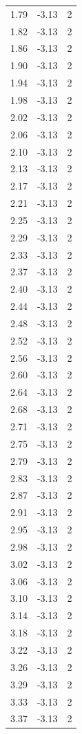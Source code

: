 \begin{longtable}{lrr}
  1.79 & -3.13 & 2 \\
  1.82 & -3.13 & 2 \\
  1.86 & -3.13 & 2 \\
  1.90 & -3.13 & 2 \\
  1.94 & -3.13 & 2 \\
  1.98 & -3.13 & 2 \\
  2.02 & -3.13 & 2 \\
  2.06 & -3.13 & 2 \\
  2.10 & -3.13 & 2 \\
  2.13 & -3.13 & 2 \\
  2.17 & -3.13 & 2 \\
  2.21 & -3.13 & 2 \\
  2.25 & -3.13 & 2 \\
  2.29 & -3.13 & 2 \\
  2.33 & -3.13 & 2 \\
  2.37 & -3.13 & 2 \\
  2.40 & -3.13 & 2 \\
  2.44 & -3.13 & 2 \\
  2.48 & -3.13 & 2 \\
  2.52 & -3.13 & 2 \\
  2.56 & -3.13 & 2 \\
  2.60 & -3.13 & 2 \\
  2.64 & -3.13 & 2 \\
  2.68 & -3.13 & 2 \\
  2.71 & -3.13 & 2 \\
  2.75 & -3.13 & 2 \\
  2.79 & -3.13 & 2 \\
  2.83 & -3.13 & 2 \\
  2.87 & -3.13 & 2 \\
  2.91 & -3.13 & 2 \\
  2.95 & -3.13 & 2 \\
  2.98 & -3.13 & 2 \\
  3.02 & -3.13 & 2 \\
  3.06 & -3.13 & 2 \\
  3.10 & -3.13 & 2 \\
  3.14 & -3.13 & 2 \\
  3.18 & -3.13 & 2 \\
  3.22 & -3.13 & 2 \\
  3.26 & -3.13 & 2 \\
  3.29 & -3.13 & 2 \\
  3.33 & -3.13 & 2 \\
  3.37 & -3.13 & 2 \\

\end{longtable}
